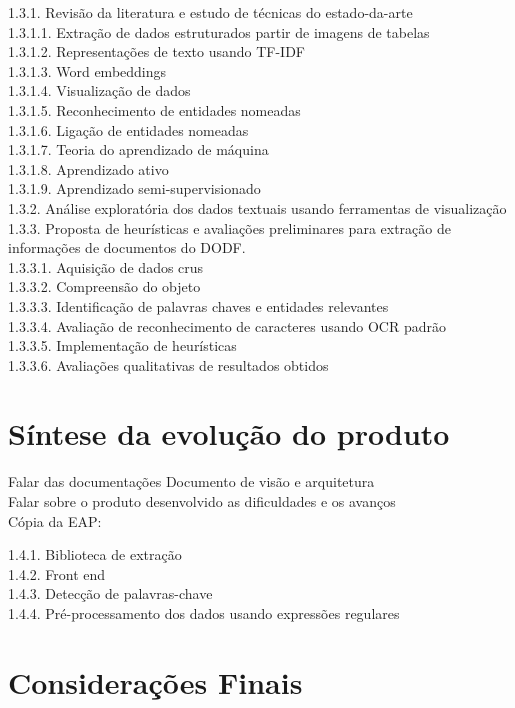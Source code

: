 \documentclass[12pt]{article}
\begin{document}
1.3.1. Revisão da literatura e estudo de técnicas do estado-da-arte\\
1.3.1.1. Extração de dados estruturados partir de imagens de tabelas\\
1.3.1.2. Representações de texto usando TF-IDF\\
1.3.1.3. Word embeddings\\
1.3.1.4. Visualização de dados\\
1.3.1.5. Reconhecimento de entidades nomeadas\\
1.3.1.6. Ligação de entidades nomeadas\\
1.3.1.7. Teoria do aprendizado de máquina\\
1.3.1.8. Aprendizado ativo\\
1.3.1.9. Aprendizado semi-supervisionado\\
1.3.2. Análise exploratória dos dados textuais usando ferramentas de visualização\\
1.3.3. Proposta de heurísticas e avaliações preliminares para extração de informações de
documentos do DODF.\\
1.3.3.1. Aquisição de dados crus\\
1.3.3.2. Compreensão do objeto\\
1.3.3.3. Identificação de palavras chaves e entidades relevantes\\
1.3.3.4. Avaliação de reconhecimento de caracteres usando OCR padrão\\
1.3.3.5. Implementação de heurísticas\\
1.3.3.6. Avaliações qualitativas de resultados obtidos\\


\section{Síntese da evolução do produto}
\label{sec:sintese}

Falar das documentações Documento de visão e arquitetura\\
Falar sobre o produto desenvolvido as dificuldades e os avanços\\

Cópia da EAP:

1.4.1. Biblioteca de extração\\
1.4.2. Front end\\
1.4.3. Detecção de palavras-chave\\
1.4.4. Pré-processamento dos dados usando expressões regulares\\

\section{Considerações Finais}
\label{sec:consideracoes}




\end{document}
